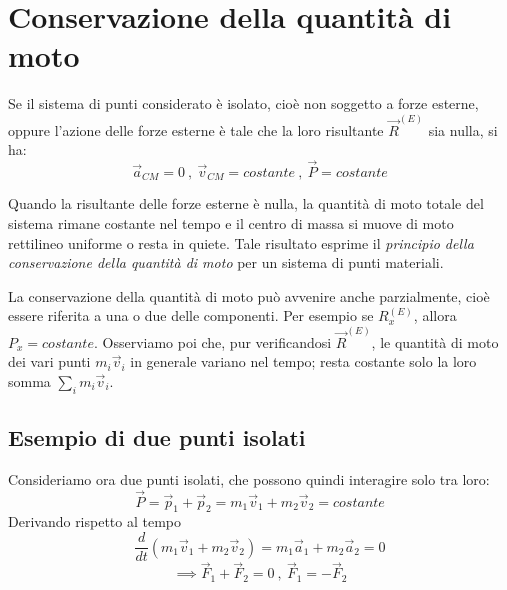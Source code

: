 \documentclass[class=book, crop=false, oneside, 12pt]{standalone}
\begin{document}
\section{Conservazione della quantità di moto}

Se il sistema di punti considerato è isolato, cioè non soggetto a forze esterne, oppure l'azione delle forze esterne è tale che la loro risultante \(\overrightarrow{R}^{(E)}\) sia nulla, si ha:
\begin{equation}
    \overrightarrow{a}_{CM} = 0 \ , \ \overrightarrow{v}_{CM} = costante \ , \ \overrightarrow{P} = costante
\end{equation}

Quando la risultante delle forze esterne è nulla, la quantità di moto totale del sistema rimane costante nel tempo e il centro di massa si muove di moto rettilineo uniforme o resta in quiete. 
Tale risultato esprime il \emph{principio della conservazione della quantità di moto} per un sistema di punti materiali. 

La conservazione della quantità di moto può avvenire anche parzialmente, cioè essere riferita a una o due delle componenti. 
Per esempio se \(R_x^{(E)}\), allora \(P_x = costante\). 
Osserviamo poi che, pur verificandosi \(\overrightarrow{R}^{(E)}\), le quantità di moto dei vari punti \(m_i \overrightarrow{v}_i\) in generale variano nel tempo; resta costante solo la loro somma \(\sum_i m_i \overrightarrow{v}_i\).

\subsection{Esempio di due punti isolati}

Consideriamo ora due punti isolati, che possono quindi interagire solo tra loro: 
\begin{equation}
    \overrightarrow{P} = \overrightarrow{p}_1 + \overrightarrow{p}_2 = m_1 \overrightarrow{v}_1 + m_2 \overrightarrow{v}_2 = costante
\end{equation}
Derivando rispetto al tempo
\begin{equation*}
    \frac{d}{dt} \left(m_1 \overrightarrow{v}_1 + m_2 \overrightarrow{v}_2\right) = m_1 \overrightarrow{a}_1 + m_2 \overrightarrow{a}_2 = 0 
\end{equation*}
\begin{equation*}
    \implies \overrightarrow{F}_1 + \overrightarrow{F}_2 = 0 \ , \ \overrightarrow{F}_1 = - \overrightarrow{F}_2
\end{equation*}
\end{document}
